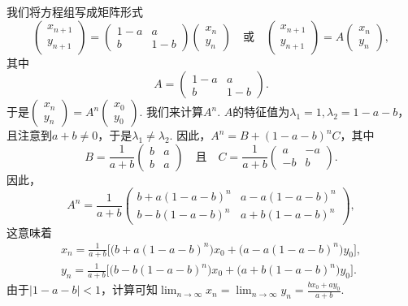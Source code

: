\begin{solution}
  我们将方程组写成矩阵形式
  \[
    \begin{pmatrix}
      x_{n+1} \\ y_{n+1}
    \end{pmatrix} = \begin{pmatrix}
      1 - a & a \\
      b & 1 - b
    \end{pmatrix} \begin{pmatrix}
      x_n \\ y_n
    \end{pmatrix}\quad \text{或} \quad
    \begin{pmatrix}
      x_{n+1} \\ y_{n+1}
    \end{pmatrix} = A \begin{pmatrix}
      x_n \\ y_n
    \end{pmatrix},
  \]
  其中
  \[
    A = \begin{pmatrix}
      1 - a & a \\
      b & 1 - b
    \end{pmatrix}.
  \]
  于是$\begin{pmatrix}
      x_n \\ y_n
    \end{pmatrix}=A^n\begin{pmatrix}
      x_0 \\ y_0
    \end{pmatrix}$. 我们来计算$A^n$. $A$的特征值为$\lambda_1=1,\lambda_2=1-a-b$，且注意到$a+b\ne0$，于是$\lambda_1\ne\lambda_2$. 因此，$A^n=B+(1-a-b)^nC$，其中
    \[
      B = \frac1{a+b} \begin{pmatrix}
        b & a \\
        b & a
      \end{pmatrix}\quad \text{且} \quad
      C = \frac1{a+b} \begin{pmatrix}
        a & -a \\
        -b & b
      \end{pmatrix}.
    \]
    因此，
    \[
      A^n = \frac1{a+b} \begin{pmatrix}
        b + a(1 - a - b)^n & a - a(1 - a - b)^n \\
        b - b(1 - a - b)^n & a + b(1 - a - b)^n
      \end{pmatrix},
    \]
    这意味着
    \begin{gather*}
      x_n = \frac1{a+b} \big[ \big(
      b + a(1 - a - b)^n\big)x_0 +
      \big( a - a(1 - a - b)^n \big)y_0\big], \\
      y_n = \frac1{a+b} \big[ \big(
      b - b(1 - a - b)^n\big)x_0 +
      \big( a + b(1 - a - b)^n \big)y_0\big].
    \end{gather*}
    由于$|1-a-b|<1$，计算可知$\lim_{n\to\infty}x_n
    =\lim_{n\to\infty}y_n=\frac{bx_0+ay_0}{a+b}$.
\end{solution}

